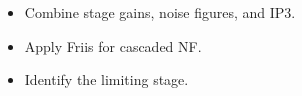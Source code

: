 \begin{objectives}
\begin{itemize}[leftmargin=1.4em,itemsep=2pt]
\item Combine stage gains, noise figures, and IP3.
\item Apply Friis for cascaded NF.
\item Identify the limiting stage.
\end{itemize}
\end{objectives}
